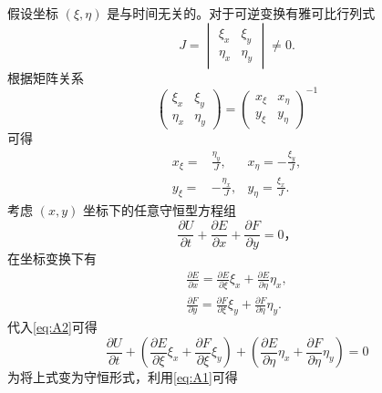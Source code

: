 \documentclass[12pt]{article}
\begin{document}
假设坐标 $(\xi, \eta)$ 是与时间无关的。对于可逆变换有雅可比行列式
\begin{equation}
	J=
	\begin{vmatrix}
		\xi_{x}  & \xi_{y}  \\
		\eta_{x} & \eta_{y}
	\end{vmatrix}\not=0.
\end{equation}
根据矩阵关系
\begin{equation}
	\left(\begin{array}{ll}
			\xi_{x}  & \xi_{y}  \\
			\eta_{x} & \eta_{y}
		\end{array}\right)=\left(\begin{array}{ll}
		x_{\xi} & x_{\eta} \\
		y_{\xi} & y_{\eta}
	\end{array}\right)^{-1}
\end{equation}
可得
\begin{equation}
	\begin{aligned}
		x_{\xi}= & \frac{\eta_{y}}{J},  & x_{\eta}=    -\frac{\xi_{y}}{J}, \\
		y_{\xi}= & -\frac{\eta_{x}}{J}, & y_{\eta}  =  \frac{\xi_{x}}{J}.
	\end{aligned}
	\label{eq:A1}
\end{equation}
考虑 $(x, y)$ 坐标下的任意守恒型方程组
\begin{equation}
	\frac{\partial U}{\partial t}+\frac{\partial E}{\partial x}+\frac{\partial F}{\partial y}=0，
	\label{eq:A2}
\end{equation}
在坐标变换下有
\begin{equation}
	\begin{aligned}
		\frac{\partial E}{\partial x}=\frac{\partial E}{\partial \xi} \xi_{x}+\frac{\partial E}{\partial \eta} \eta_{x}, \\
		\frac{\partial F}{\partial y}=\frac{\partial F}{\partial \xi} \xi_{y}+\frac{\partial F}{\partial \eta} \eta_{y}.
	\end{aligned}
\end{equation}
代入\cref{eq:A2}可得
\begin{equation}
	\frac{\partial U}{\partial t}+\left(\frac{\partial E}{\partial \xi} \xi_{x}+\frac{\partial F}{\partial \xi} \xi_{y}\right)+\left(\frac{\partial E}{\partial \eta} \eta_{x}+\frac{\partial F}{\partial \eta} \eta_{y}\right)=0
	\label{eq:A3}
\end{equation}
为将上式变为守恒形式，利用\cref{eq:A1}可得
\end{document}
